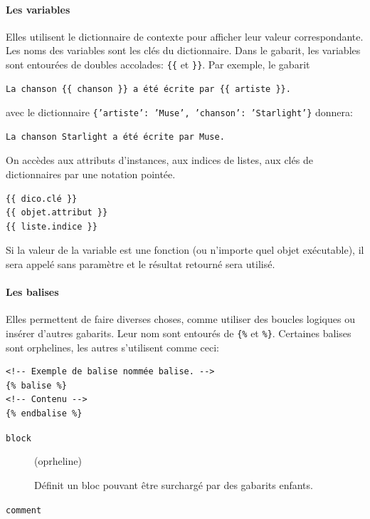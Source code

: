 \documentclass[a4paper, 10pt]{article}
\newcommand{\code}[1]{{\small\texttt{#1}}}
\begin{document}
{\paragraph{Les variables}
Elles utilisent le dictionnaire de contexte pour afficher leur valeur correspondante. Les noms des variables sont les clés du dictionnaire. Dans le gabarit, les variables sont entourées de doubles accolades: \code{\{\{} et \code{\}\}}. Par exemple, le gabarit
\begin{verbatim}
La chanson {{ chanson }} a été écrite par {{ artiste }}.
\end{verbatim}
avec le dictionnaire \code{\{'artiste': 'Muse', 'chanson': 'Starlight'\}} donnera:
\begin{verbatim}
La chanson Starlight a été écrite par Muse.
\end{verbatim}

On accèdes aux attributs d'instances, aux indices de listes, aux clés de dictionnaires par une notation pointée.
\begin{verbatim}
{{ dico.clé }}
{{ objet.attribut }}
{{ liste.indice }}
\end{verbatim}

Si la valeur de la variable est une fonction (ou n'importe quel objet exécutable), il sera appelé sans paramètre et le résultat retourné sera utilisé.

\paragraph{Les balises} Elles permettent de faire diverses choses, comme utiliser des boucles logiques ou insérer d'autres gabarits. Leur nom sont entourés de \code{\{\%} et \code{\%\}}. Certaines balises sont orphelines, les autres s'utilisent comme ceci:

\begin{verbatim}
<!-- Exemple de balise nommée balise. -->
{% balise %}
<!-- Contenu -->
{% endbalise %}
\end{verbatim}

\begin{description}
    \item[\code{block}] (oprheline)~

    Définit un bloc pouvant être surchargé par des gabarits enfants.

    \item[\code{comment}]~


\end{description}}
\end{document}
